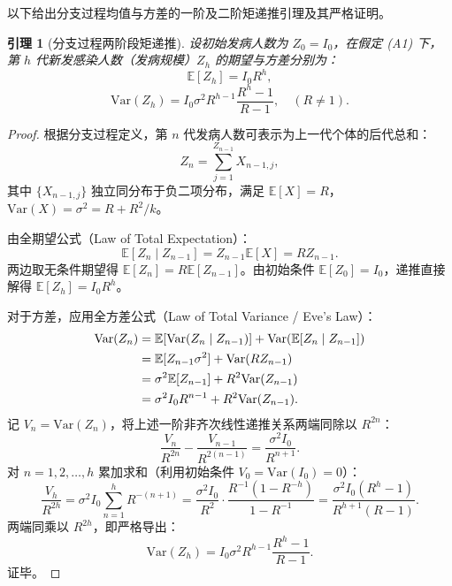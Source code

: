\documentclass[11pt,a4paper]{article}
\theoremstyle{plain}
\newtheorem{lemma}{引理}
\theoremstyle{definition}
\begin{document}
以下给出分支过程均值与方差的一阶及二阶矩递推引理及其严格证明。

\begin{lemma}[分支过程两阶段矩递推]\label{lem:branch_moments}
设初始发病人数为 $Z_0 = I_0$，在假定 (A1) 下，第 $h$ 代新发感染人数（发病规模）$Z_h$ 的期望与方差分别为：
\begin{equation}
\mathbb{E}[Z_h] = I_0 R^h,
\end{equation}
\begin{equation}
\text{Var}(Z_h) = I_0 \sigma^2 R^{h-1} \frac{R^h - 1}{R - 1}, \quad (R \neq 1).
\label{eq:lem1_var}
\end{equation}
\end{lemma}

\begin{proof}
根据分支过程定义，第 $n$ 代发病人数可表示为上一代个体的后代总和：
\begin{equation}
Z_n = \sum_{j=1}^{Z_{n-1}} X_{n-1, j},
\end{equation}
其中 $\{X_{n-1, j}\}$ 独立同分布于负二项分布，满足 $\mathbb{E}[X] = R$，$\text{Var}(X) = \sigma^2 = R + R^2/k$。

由全期望公式（Law of Total Expectation）：
\begin{equation}
\mathbb{E}[Z_n \mid Z_{n-1}] = Z_{n-1} \mathbb{E}[X] = R Z_{n-1}.
\end{equation}
两边取无条件期望得 $\mathbb{E}[Z_n] = R \mathbb{E}[Z_{n-1}]$。由初始条件 $\mathbb{E}[Z_0] = I_0$，递推直接解得 $\mathbb{E}[Z_h] = I_0 R^h$。

对于方差，应用全方差公式（Law of Total Variance / Eve's Law）：
\begin{align}
\text{Var}(Z_n) &= \mathbb{E}[\text{Var}(Z_n \mid Z_{n-1})] + \text{Var}(\mathbb{E}[Z_n \mid Z_{n-1}]) \notag \\
&= \mathbb{E}[Z_{n-1} \sigma^2] + \text{Var}(R Z_{n-1}) \notag \\
&= \sigma^2 \mathbb{E}[Z_{n-1}] + R^2 \text{Var}(Z_{n-1}) \notag \\
&= \sigma^2 I_0 R^{n-1} + R^2 \text{Var}(Z_{n-1}).
\end{align}
记 $V_n = \text{Var}(Z_n)$，将上述一阶非齐次线性递推关系两端同除以 $R^{2n}$：
\begin{equation}
\frac{V_n}{R^{2n}} - \frac{V_{n-1}}{R^{2(n-1)}} = \frac{\sigma^2 I_0}{R^{n+1}}.
\end{equation}
对 $n = 1, 2, \dots, h$ 累加求和（利用初始条件 $V_0 = \text{Var}(I_0) = 0$）：
\begin{equation}
\frac{V_h}{R^{2h}} = \sigma^2 I_0 \sum_{n=1}^h R^{-(n+1)} = \frac{\sigma^2 I_0}{R^2} \cdot \frac{R^{-1}(1 - R^{-h})}{1 - R^{-1}} = \frac{\sigma^2 I_0 (R^h - 1)}{R^{h+1}(R - 1)}.
\end{equation}
两端同乘以 $R^{2h}$，即严格导出：
\begin{equation}
\text{Var}(Z_h) = I_0 \sigma^2 R^{h-1} \frac{R^h - 1}{R - 1}.
\end{equation}
证毕。
\end{proof}
\end{document}
